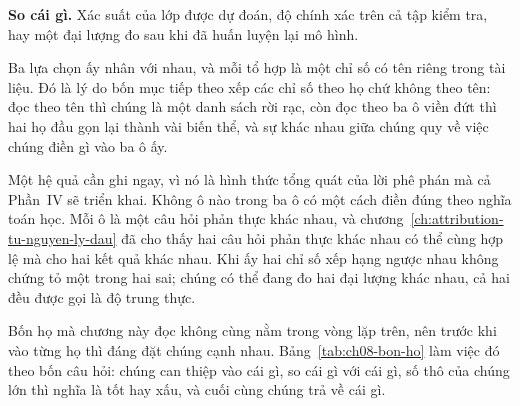 \textbf{So cái gì.} Xác suất của lớp được dự đoán, độ chính xác trên cả tập
kiểm tra, hay một đại lượng đo sau khi đã huấn luyện lại mô hình.

Ba lựa chọn ấy nhân với nhau, và mỗi tổ hợp là một chỉ số có tên riêng trong
tài liệu. Đó là lý do bốn mục tiếp theo xếp các chỉ số theo họ chứ không theo
tên: đọc theo tên thì chúng là một danh sách rời rạc, còn đọc theo ba ô viền đứt
thì hai họ đầu gọn lại thành vài biến thể, và sự khác nhau giữa chúng quy về
việc chúng điền gì vào ba ô ấy.

Một hệ quả cần ghi ngay, vì nó là hình thức tổng quát của lời phê phán mà cả
Phần~IV sẽ triển khai. Không ô nào trong ba ô có một cách điền đúng theo nghĩa
toán học. Mỗi ô là một câu hỏi phản thực khác nhau, và
chương~\ref{ch:attribution-tu-nguyen-ly-dau} đã cho thấy hai câu hỏi phản thực
khác nhau có thể cùng hợp lệ mà cho hai kết quả khác nhau. Khi ấy hai chỉ số
xếp hạng ngược nhau không chứng tỏ một trong hai sai; chúng có thể đang đo hai
đại lượng khác nhau, cả hai đều được gọi là độ trung thực.

Bốn họ mà chương này đọc không cùng nằm trong vòng lặp trên, nên trước khi vào
từng họ thì đáng đặt chúng cạnh nhau. Bảng~\ref{tab:ch08-bon-ho} làm việc đó
theo bốn câu hỏi: chúng can thiệp vào cái gì, so cái gì với cái gì, số thô của
chúng lớn thì nghĩa là tốt hay xấu, và cuối cùng chúng trả về cái gì.

